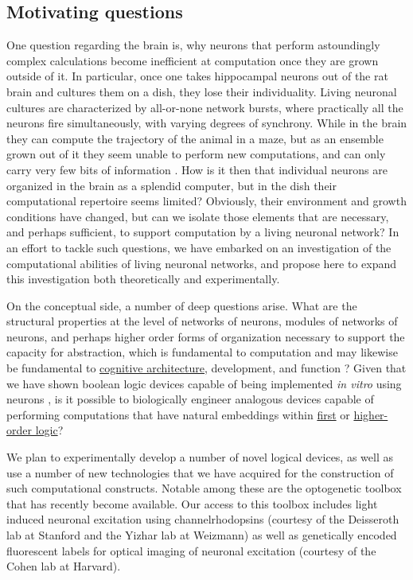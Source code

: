 \subsection{Motivating questions}
\label{sec:questions}
One question regarding the brain is, why neurons that perform astoundingly complex calculations become inefficient at computation once they are grown outside of it. In particular, once one takes hippocampal neurons out of the rat brain and cultures them on a dish, they lose their individuality. Living neuronal cultures are characterized by all-or-none network bursts, where practically all the neurons fire simultaneously, with varying degrees of synchrony. While in the brain they can compute the trajectory of the animal in a maze, but as an ensemble grown out of it they seem unable to perform new computations, and can only carry very few bits of information \cite{Feinerman2006}. How is it then that individual neurons are organized in the brain as a splendid computer, but in the dish their computational repertoire seems limited? Obviously, their environment and growth conditions have changed, but can we isolate those elements that are necessary, and perhaps sufficient, to support computation by a living neuronal network? In an effort to tackle such questions, we have embarked on an investigation of the computational abilities of living neuronal networks, and propose here to expand this investigation both theoretically and experimentally.

On the conceptual side, a number of deep questions arise. What are the structural properties at the level of networks of neurons,
modules of networks of neurons, and perhaps higher order forms of
organization necessary to support the capacity for
abstraction, which is fundamental to computation \cite{Abelson1996} and may likewise be fundamental to
\href{http://en.wikipedia.org/wiki/Cognitive\_architecture}{cognitive
architecture}, development, and function \cite{Tenenbaum2011}? Given that we have shown boolean
logic devices capable of being implemented {\em in vitro} using
neurons \cite{Feinerman2008}, is it possible to biologically engineer analogous
devices capable of performing computations that have natural embeddings
within \href{http://en.wikipedia.org/wiki/First-order\_logic}{first} or
\href{http://en.wikipedia.org/wiki/Higher\_order\_logic}{higher-order
logic}?

We plan to experimentally develop a number of novel logical devices, as well as use a number of new technologies that we have acquired for the construction of such computational constructs. Notable among these are the optogenetic toolbox that has recently become available. Our access to this toolbox includes light induced neuronal excitation using channelrhodopsins (courtesy of the Deisseroth lab at Stanford and the Yizhar lab at Weizmann) as well as genetically encoded fluorescent labels for optical imaging of neuronal excitation (courtesy of the Cohen lab at Harvard).

